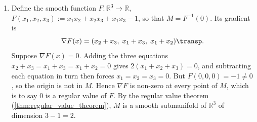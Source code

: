 \begin{exercisesolution}
\label{sol:submanifold_quadric_tangent_space}
\begin{enumerate}[label=\textbf{(\alph*)}]
  \item Define the smooth function $F : \mathbb{R}^3 \to \mathbb{R}$,
    $F(x_1,x_2,x_3) := x_1 x_2 + x_2 x_3 + x_1 x_3 - 1$, so that $M = F^{-1}(0)$. Its gradient is
\[\nabla F(x) = (x_2+x_3,\; x_1+x_3,\; x_1+x_2)\transp .\]
    Suppose $\nabla F(x) = 0$. Adding the three equations $x_2+x_3 = x_1+x_3 = x_1+x_2 = 0$ gives
    $2(x_1+x_2+x_3) = 0$, and subtracting each equation in turn then forces $x_1 = x_2 = x_3 = 0$.
    But $F(0,0,0) = -1 \neq 0$, so the origin is not in $M$. Hence $\nabla F$ is non-zero at every
    point of $M$, which is to say $0$ is a regular value of $F$. By the regular value theorem
    (\cref{thm:regular_value_theorem}), $M$ is a smooth submanifold of $\mathbb{R}^3$ of dimension
    $3 - 1 = 2$.


\end{enumerate}
\end{exercisesolution}
